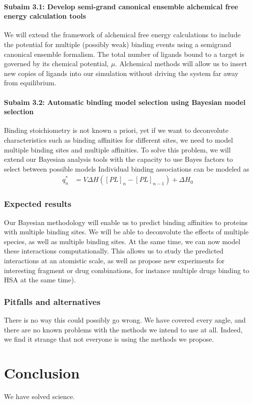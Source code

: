 \documentclass[10pt]{article}
\newcommand{\subsubsubsection}[1]{\paragraph*{#1}}
\begin{document}
\subsubsubsection{Subaim 3.1: Develop semi-grand canonical ensemble alchemical free energy calculation tools}
We will extend the framework of alchemical free energy calculations to include the potential for multiple (possibly weak) binding events using a semigrand canonical ensemble formalism. The total number of ligands bound to a target is governed by its chemical potential, $\mu$. Alchemical methods will allow us to insert new copies of ligands into our simulation without driving the system far away from equilibrium. 

\subsubsubsection{Subaim 3.2: Automatic binding model selection using Bayesian model selection}
Binding stoichiometry is not known a priori, yet if we want to deconvolute characteristics such as binding affinities for different sites, we need to model multiple binding sites and multiple affinities. To solve this problem, we will extend our Bayesian analysis tools with the capacity to use Bayes factors to select between possible models 
Individual binding associations can be modeled as
\begin{align}
q_n^* &= V \Delta H \left( [PL]_n - [PL]_{n-1} \right) + \Delta H_0 \label{equation:liberated-heat}
\end{align}

\subsubsection*{Expected results}
Our Bayesian methodology will enable us to predict binding affinities to proteins with multiple binding sites. We will be able to deconvolute the effects of multiple species, as well as multiple binding sites. At the same time, we can now model these interactions computationally. This allows us to study the predicted interactions at an atomistic scale, as well as propose new experiments for interesting fragment or drug combinations, for instance multiple drugs binding to HSA at the same time).

\subsubsection*{Pitfalls and alternatives}
There is no way this could possibly go wrong. We have covered every angle, and there are no known problems with the methods we intend to use at all. Indeed, we find it strange that not everyone is using the methods we propose.
\section*{Conclusion}
We have solved science.

\printbibliography
\end{document}
